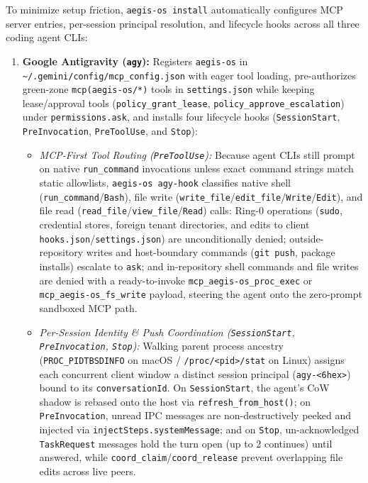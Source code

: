 \documentclass[10pt,twocolumn]{article}
\begin{document}
To minimize setup friction, \texttt{aegis-os install} automatically configures MCP server entries, per-session principal resolution, and lifecycle hooks across all three coding agent CLIs:
\begin{enumerate}
    \item \textbf{Google Antigravity (\texttt{agy}):} Registers \texttt{aegis-os} in \texttt{\textasciitilde/.gemini/config/mcp\_config.json} with eager tool loading, pre-authorizes green-zone \texttt{mcp(aegis-os/*)} tools in \texttt{settings.json} while keeping lease/approval tools (\texttt{policy\_grant\_lease}, \texttt{policy\_approve\_escalation}) under \texttt{permissions.ask}, and installs four lifecycle hooks (\texttt{SessionStart}, \texttt{PreInvocation}, \texttt{PreToolUse}, and \texttt{Stop}):
    \begin{itemize}
        \item \emph{MCP-First Tool Routing (\texttt{PreToolUse}):} Because agent CLIs still prompt on native \texttt{run\_command} invocations unless exact command strings match static allowlists, \texttt{aegis-os agy-hook} classifies native shell (\texttt{run\_command}/\texttt{Bash}), file write (\texttt{write\_file}/\texttt{edit\_file}/\texttt{Write}/\texttt{Edit}), and file read (\texttt{read\_file}/\texttt{view\_file}/\texttt{Read}) calls: Ring-0 operations (\texttt{sudo}, credential stores, foreign tenant directories, and edits to client \texttt{hooks.json}/\texttt{settings.json}) are unconditionally denied; outside-repository writes and host-boundary commands (\texttt{git push}, package installs) escalate to \texttt{ask}; and in-repository shell commands and file writes are denied with a ready-to-invoke \texttt{mcp\_aegis-os\_proc\_exec} or \texttt{mcp\_aegis-os\_fs\_write} payload, steering the agent onto the zero-prompt sandboxed MCP path.
        \item \emph{Per-Session Identity \& Push Coordination (\texttt{SessionStart}, \texttt{PreInvocation}, \texttt{Stop}):} Walking parent process ancestry (\texttt{PROC\_PIDTBSDINFO} on macOS / \texttt{/proc/<pid>/stat} on Linux) assigns each concurrent client window a distinct session principal (\texttt{agy-<6hex>}) bound to its \texttt{conversationId}. On \texttt{SessionStart}, the agent's CoW shadow is rebased onto the host via \texttt{refresh\_from\_host()}; on \texttt{PreInvocation}, unread IPC messages are non-destructively peeked and injected via \texttt{injectSteps.systemMessage}; and on \texttt{Stop}, un-acknowledged \texttt{TaskRequest} messages hold the turn open (up to 2 continues) until answered, while \texttt{coord\_claim}/\texttt{coord\_release} prevent overlapping file edits across live peers.

\end{itemize}
\end{enumerate}
\end{document}
